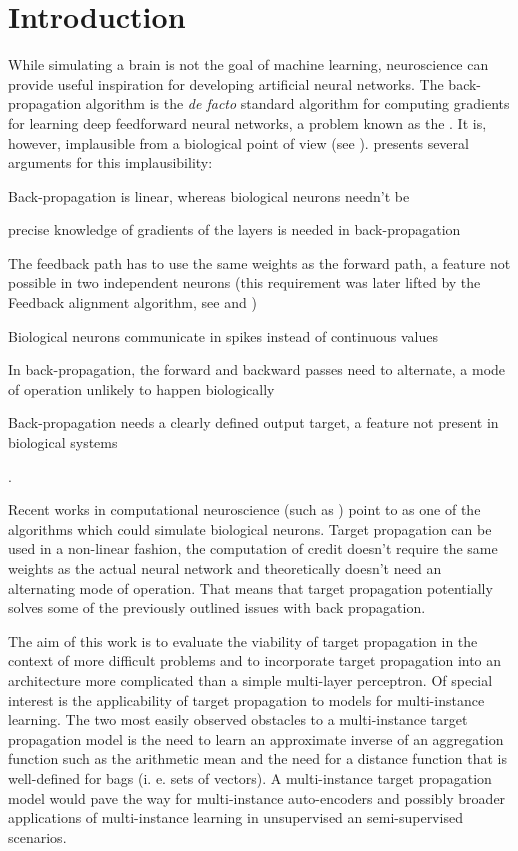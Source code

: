 \chapter*{Introduction}

While simulating a brain is not the goal of machine learning, neuroscience can provide useful inspiration for developing artificial neural networks. The back-propagation algorithm is the \textit{de facto} standard algorithm for computing gradients for learning deep feedforward neural networks, a problem known as the . It is, however, implausible from a biological point of view (see \cite{crick_recent_1989}). \cite{bengio_towards_2015} presents several arguments for this implausibility:
\begin{enumerate*}[label=(\arabic*)]
	\item Back-propagation is linear, whereas biological neurons needn't be
	\item precise knowledge of gradients of the layers is needed in back-propagation
	\item The feedback path has to use the same weights as the forward path, a feature not possible in two independent neurons (this requirement was later lifted by the Feedback alignment algorithm, see \cite{lillicrap_random_2016} and \cite{nokland_direct_2016})
	\item Biological neurons communicate in spikes instead of continuous values
	\item In back-propagation, the forward and backward passes need to alternate, a mode of operation unlikely to happen biologically
	\item Back-propagation needs a clearly defined output target, a feature not present in biological systems
\end{enumerate*}.

Recent works in computational neuroscience (such as \cite{guerguiev_towards_2017}) point to  as one of the algorithms which could simulate biological neurons. Target propagation can be used in a non-linear fashion, the computation of credit doesn't require the same weights as the actual neural network and theoretically doesn't need an alternating mode of operation. That means that target propagation potentially solves some of the previously outlined issues with back propagation.

The aim of this work is to evaluate the viability of target propagation in the context of more difficult problems and to incorporate target propagation into an architecture more complicated than a simple multi-layer perceptron. Of special interest is the applicability of target propagation to models for multi-instance learning. The two most easily observed obstacles to a multi-instance target propagation model is the need to learn an approximate inverse of an aggregation function such as the arithmetic mean and the need for a distance function that is well-defined for bags (i. e. sets of vectors). A multi-instance target propagation model would pave the way for multi-instance auto-encoders and possibly broader applications of multi-instance learning in unsupervised an semi-supervised scenarios.

